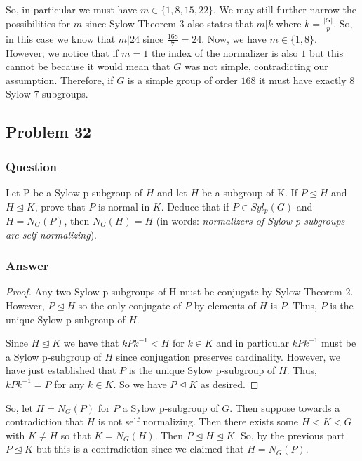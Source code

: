 \documentclass[12pt]{article}
\begin{document}
So, in particular we must have $m\in \{1, 8, 15, 22 \}$. We may still further narrow the possibilities for $m$ since Sylow Theorem 3 also states that $m|k$ where $k=\frac{|G|}{p}$. So, in this case we know that $m|24$ since $\frac{168}{7}=24$. Now, we have $m\in\{1,8\}$. However, we notice that if $m=1$ the index of the normalizer is also $1$ but this cannot be because it would mean that $G$ was not simple, contradicting our assumption. Therefore, if $G$ is a simple group of order $168$ it must have exactly $8$ Sylow 7-subgroups.

\subsection{Problem 32}

\subsubsection{Question}
Let P be a Sylow p-subgroup of $H$ and let $H$ be a subgroup of K. If $P \unlhd H$ and $H \unlhd K$, prove that $P$ is normal in $K$. Deduce that if $P\in Syl_p(G)$ and $H=N_G(P)$, then $N_G(H)=H$ (in words: \emph{normalizers of Sylow p-subgroups are self-normalizing}).

\subsubsection{Answer}

\begin{proof}Any two Sylow p-subgroups of H must be conjugate by Sylow Theorem 2. However, $P \unlhd H$ so the only conjugate of $P$ by elements of $H$ is $P$. Thus, $P$ is the unique Sylow p-subgroup of $H$.

Since $H \unlhd K$ we have that $kPk^{-1} < H$ for $k\in K$ and in particular $kPk^{-1}$ must be a Sylow p-subgroup of $H$ since conjugation preserves cardinality. However, we have just established that $P$ is the unique Sylow p-subgroup of $H$. Thus, $kPk^{-1} = P$ for any $k\in K$. So we have $P \unlhd K$ as desired.\end{proof}

So, let $H=N_G(P)$ for $P$ a Sylow p-subgroup of $G$. Then suppose towards a contradiction that $H$ is not self normalizing. Then there exists some $H<K<G$ with $K\neq H$ so that $K=N_G(H)$. Then $P\unlhd H \unlhd K$. So, by the previous part $P \unlhd K$ but this is a contradiction since we claimed that $H=N_G(P)$.
\end{document}
